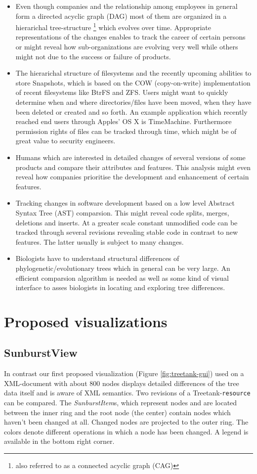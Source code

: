 \documentclass{llncs}
\begin{document}
\begin{itemize}
\item Even though companies and the relationship among employees in general form a directed acyclic graph (DAG) most of them are organized in a hierarichal tree-structure \footnote{also referred to as a connected acyclic graph (CAG)} which evolves over time. Appropriate representations of the changes enables to track the career of certain persons or might reveal how sub-organizations are evolving very well while others might not due to the success or failure of products.
\item The hierarichal structure of filesystems and the recently upcoming abilities to store Snapshots, which is based on the COW (copy-on-write) implementation of recent filesystems like BtrFS and ZFS. Users might want to quickly determine when and where directories/files have been moved, when they have been deleted or created and so forth. An example application which recently reached end users through Apples' OS X is TimeMachine. Furthermore permission rights of files can be tracked through time, which might be of great value to security engineers.
\item Humans which are interested in detailed changes of several versions of some products and compare their attributes and features. This analysis might even reveal how companies prioritise the development and enhancement of certain features.
\item Tracking changes in software development based on a low level Abstract Syntax Tree (AST) comparsion. This might reveal code splits, merges, deletions and inserts. At a greater scale constant unmodified code can be tracked through several revisions revealing stable code in contrast to new features. The latter usually is subject to many changes.
\item Biologists have to understand structural differences of phylogenetic/evolutionary trees which in general can be very large. An efficient comparsion algorithm is needed as well as some kind of visual interface to asses biologists in locating and exploring tree differences.
\end{itemize} 

\section{Proposed visualizations}
\subsection{SunburstView}
In contrast our first proposed visualization (Figure \ref{fig:treetank-gui}) used on a XML-document with about 800 nodes displays detailed differences of the tree data itself and is aware of XML semantics. Two revisions of a Treetank-\texttt{resource} can be compared. The \emph{SunburstItem}s, which represent nodes and are located between the inner ring and the root node (the center) contain nodes which haven't been changed at all. Changed nodes are projected to the outer ring. The colors denote different operations in which a node has been changed. A legend is available in the bottom right corner.
\end{document}
